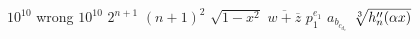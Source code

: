 $10^10$ wrong $10^{10}$
$2^{n+1}$
$(n+1)^2$
$\sqrt{1-x^2}$
$\overline{w+\overline z}$
$p^{e_1}_1$
$a_{b_{c_{d_e}}}$
$\root 3 \of{h''_n(\alpha x)}$


\bye

